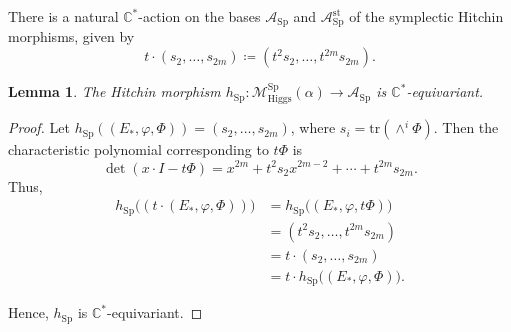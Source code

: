 \documentclass[11pt, reqno]{amsart}
\numberwithin{equation}{section}
\newtheorem{lemma}[theorem]{Lemma}
\theoremstyle{definition}
\begin{document}
There is a natural $\mathbb{C}^*$-action on the bases $\mathcal{A}_{\mathrm{Sp}}$ and $\mathcal{A}^{\mathrm{st}}_{\mathrm{Sp}}$ of the symplectic Hitchin morphisms, given by
\[
t\cdot (s_2,\dots , s_{2m}) \coloneqq (t^2s_2,\dots , t^{2m}s_{2m}).
\]
\begin{lemma}\label{equivariant}
    The Hitchin morphism $h_{\mathrm{Sp}} : \mathcal{M}^{\mathrm{Sp}}_{\mathrm{Higgs}}(\alpha) \rightarrow \mathcal{A}_{\mathrm{Sp}}$ is $\mathbb{C}^*$-equivariant.
\end{lemma}
\begin{proof}
    Let $h_{\mathrm{Sp}}((E_*,\varphi, \Phi)) = (s_2,\dots, s_{2m})$, where $s_i = \mathrm{tr}(\wedge^i\Phi)$. Then the characteristic polynomial corresponding to $t\Phi$ is 
    \[
\det(x\cdot I - t\Phi) = x^{2m} + t^2s_2x^{2m-2} + \cdots + t^{2m}s_{2m}.
\]
Thus, 
\begin{align*}
   h_{\mathrm{Sp}}\big((t\cdot (E_*,\varphi,\Phi))\big) &=h_{\mathrm{Sp}}\big((E_*,\varphi,t\Phi)\big)\\ 
   &=(t^2s_2,\dots , t^{2m}s_{2m}) \\
   &= t\cdot (s_2,\dots , s_{2m}) \\
   &= t\cdot h_{\mathrm{Sp}}\big((E_*,\varphi,\Phi)\big). 
\end{align*}

Hence, $h_{\mathrm{Sp}}$ is $\mathbb{C}^*$-equivariant.
\end{proof}
\end{document}
